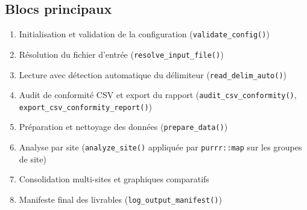 \documentclass[11pt,a4paper]{article}
\begin{document}
\subsection{Blocs principaux}
\begin{enumerate}
  \item Initialisation et validation de la configuration (\texttt{validate\_config()})
  \item Résolution du fichier d'entrée (\texttt{resolve\_input\_file()})
  \item Lecture avec détection automatique du délimiteur (\texttt{read\_delim\_auto()})
  \item Audit de conformité CSV et export du rapport (\texttt{audit\_csv\_conformity()}, \texttt{export\_csv\_conformity\_report()})
  \item Préparation et nettoyage des données (\texttt{prepare\_data()})
  \item Analyse par site (\texttt{analyze\_site()} appliquée par \texttt{purrr::map} sur les groupes de site)
  \item Consolidation multi-sites et graphiques comparatifs
  \item Manifeste final des livrables (\texttt{log\_output\_manifest()})
\end{enumerate}
\end{document}
